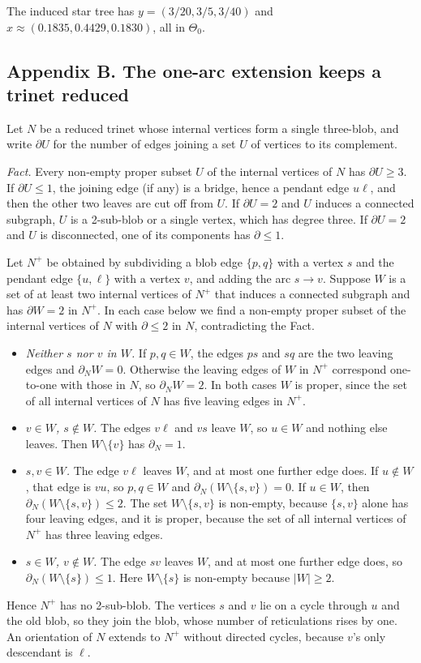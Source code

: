 \documentclass[
  11pt,
]{article}
\providecommand{\tightlist}{%
  \setlength{\itemsep}{0pt}\setlength{\parskip}{0pt}}
\begin{document}
The induced star tree has \(y=(3/20,3/5,3/40)\) and
\(x\approx(0.1835,0.4429,0.1830)\), all in \(\Theta_0\).

\subsection{Appendix B. The one-arc extension keeps a trinet
reduced}\label{appendix-b.-the-one-arc-extension-keeps-a-trinet-reduced}

Let \(N\) be a reduced trinet whose internal vertices form a single
three-blob, and write \(\partial U\) for the number of edges joining a
set \(U\) of vertices to its complement.

\emph{Fact.} Every non-empty proper subset \(U\) of the internal
vertices of \(N\) has \(\partial U \ge 3\). If \(\partial U \le 1\), the
joining edge (if any) is a bridge, hence a pendant edge \(u\ell\), and
then the other two leaves are cut off from \(U\). If \(\partial U = 2\)
and \(U\) induces a connected subgraph, \(U\) is a 2-sub-blob or a
single vertex, which has degree three. If \(\partial U = 2\) and \(U\)
is disconnected, one of its components has \(\partial\le 1\).

Let \(N^+\) be obtained by subdividing a blob edge \(\{p,q\}\) with a
vertex \(s\) and the pendant edge \(\{u,\ell\}\) with a vertex \(v\),
and adding the arc \(s\to v\). Suppose \(W\) is a set of at least two
internal vertices of \(N^+\) that induces a connected subgraph and has
\(\partial W = 2\) in \(N^+\). In each case below we find a non-empty
proper subset of the internal vertices of \(N\) with \(\partial\le2\) in
\(N\), contradicting the Fact.

\begin{itemize}
\tightlist
\item
  \emph{Neither \(s\) nor \(v\) in \(W\).} If \(p,q\in W\), the edges
  \(ps\) and \(sq\) are the two leaving edges and \(\partial_N W = 0\).
  Otherwise the leaving edges of \(W\) in \(N^+\) correspond one-to-one
  with those in \(N\), so \(\partial_N W = 2\). In both cases \(W\) is
  proper, since the set of all internal vertices of \(N\) has five
  leaving edges in \(N^+\).
\item
  \emph{\(v\in W\), \(s\notin W\).} The edges \(v\ell\) and \(vs\) leave
  \(W\), so \(u\in W\) and nothing else leaves. Then \(W\setminus\{v\}\)
  has \(\partial_N = 1\).
\item
  \emph{\(s,v\in W\).} The edge \(v\ell\) leaves \(W\), and at most one
  further edge does. If \(u\notin W\), that edge is \(vu\), so
  \(p,q\in W\) and \(\partial_N(W\setminus\{s,v\}) = 0\). If \(u\in W\),
  then \(\partial_N(W\setminus\{s,v\}) \le 2\). The set
  \(W\setminus\{s,v\}\) is non-empty, because \(\{s,v\}\) alone has four
  leaving edges, and it is proper, because the set of all internal
  vertices of \(N^+\) has three leaving edges.
\item
  \emph{\(s\in W\), \(v\notin W\).} The edge \(sv\) leaves \(W\), and at
  most one further edge does, so \(\partial_N(W\setminus\{s\}) \le 1\).
  Here \(W\setminus\{s\}\) is non-empty because \(|W|\ge 2\).
\end{itemize}

Hence \(N^+\) has no 2-sub-blob. The vertices \(s\) and \(v\) lie on a
cycle through \(u\) and the old blob, so they join the blob, whose
number of reticulations rises by one. An orientation of \(N\) extends to
\(N^+\) without directed cycles, because \(v\)'s only descendant is
\(\ell\).
\end{document}
